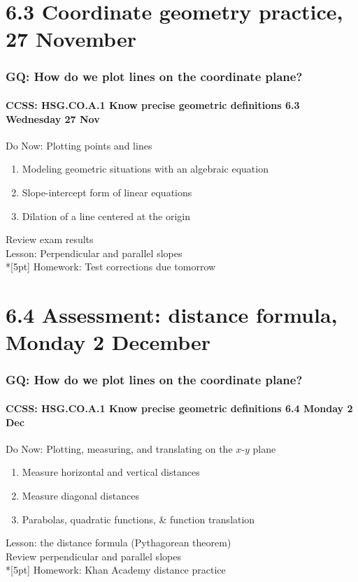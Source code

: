\documentclass{beamer}
\begin{document}
\section{6.3 Coordinate geometry practice, 27 November}
  \frame
  {
    \frametitle{GQ: How do we plot lines on the coordinate plane?}
    \framesubtitle{CCSS: HSG.CO.A.1 Know precise geometric definitions \hfill \alert{6.3 Wednesday 27 Nov}}

    \begin{block}{Do Now: Plotting points and lines}
    \begin{enumerate}
      \item Modeling geometric situations with an algebraic equation
      \item Slope-intercept form of linear equations
      \item Dilation of a line centered at the origin
    \end{enumerate}
    \end{block}
    Review exam results \\
    Lesson: Perpendicular and parallel slopes \\*[5pt]
    Homework: Test corrections due \alert{tomorrow}
  }

  \section{6.4 Assessment: distance formula, Monday 2 December}
  \frame
  {
    \frametitle{GQ: How do we plot lines on the coordinate plane?}
    \framesubtitle{CCSS: HSG.CO.A.1 Know precise geometric definitions \hfill \alert{6.4 Monday 2 Dec}}

    \begin{block}{Do Now: Plotting, measuring, and translating on the $x$-$y$ plane}
    \begin{enumerate}
      \item Measure horizontal and vertical distances
      \item Measure diagonal distances
      \item Parabolas, quadratic functions, \& function translation
    \end{enumerate}
    \end{block}
    Lesson: the distance formula (Pythagorean theorem)\\
    Review perpendicular and parallel slopes  \\*[5pt]
    Homework: Khan Academy distance practice
  }
\end{document}
